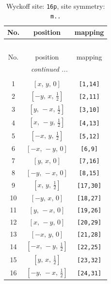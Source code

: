 \documentclass[fleqn,8pt]{jsarticle}
\begin{document}
\begin{longtable}{ccc}
\caption{Wyckoff site: {\tt 16p}, site symmetry: {\tt m..}}
 \\
 \hline \hline
No. & position & mapping \\ \hline \endfirsthead

\multicolumn{2}{l}{\tablename\ \thetable{}} \\
 \hline \hline
No. & position & mapping \\ \hline \endhead

 \hline \hline
\multicolumn{2}{r}{\footnotesize\it continued ...} \\ \endfoot

 \hline \hline
\multicolumn{2}{r}{} \\ \endlastfoot

1 & $\left[ x,\, y,\, 0 \right]$ & {\tt [1,14]} \\ \hline
2 & $\left[ - y,\, x,\, \frac{1}{2} \right]$ & {\tt [2,11]} \\ \hline
3 & $\left[ y,\, - x,\, \frac{1}{2} \right]$ & {\tt [3,10]} \\ \hline
4 & $\left[ x,\, - y,\, \frac{1}{2} \right]$ & {\tt [4,13]} \\ \hline
5 & $\left[ - x,\, y,\, \frac{1}{2} \right]$ & {\tt [5,12]} \\ \hline
6 & $\left[ - x,\, - y,\, 0 \right]$ & {\tt [6,9]} \\ \hline
7 & $\left[ y,\, x,\, 0 \right]$ & {\tt [7,16]} \\ \hline
8 & $\left[ - y,\, - x,\, 0 \right]$ & {\tt [8,15]} \\ \hline
9 & $\left[ x,\, y,\, \frac{1}{2} \right]$ & {\tt [17,30]} \\ \hline
10 & $\left[ - y,\, x,\, 0 \right]$ & {\tt [18,27]} \\ \hline
11 & $\left[ y,\, - x,\, 0 \right]$ & {\tt [19,26]} \\ \hline
12 & $\left[ x,\, - y,\, 0 \right]$ & {\tt [20,29]} \\ \hline
13 & $\left[ - x,\, y,\, 0 \right]$ & {\tt [21,28]} \\ \hline
14 & $\left[ - x,\, - y,\, \frac{1}{2} \right]$ & {\tt [22,25]} \\ \hline
15 & $\left[ y,\, x,\, \frac{1}{2} \right]$ & {\tt [23,32]} \\ \hline
16 & $\left[ - y,\, - x,\, \frac{1}{2} \right]$ & {\tt [24,31]} \\
\end{longtable}
\renewcommand{\arraystretch}{1.2}
\end{document}
